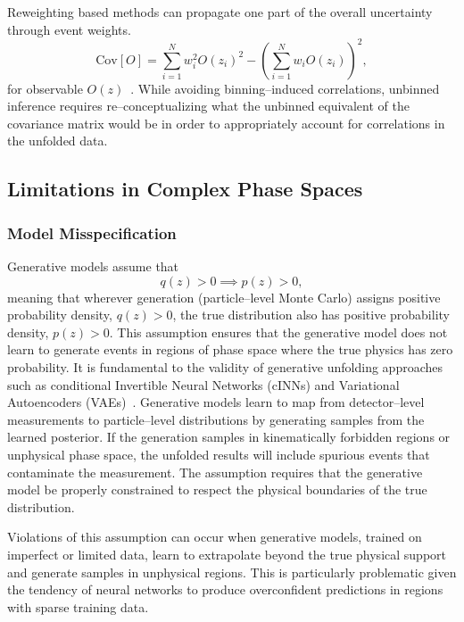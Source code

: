             Reweighting based methods can propagate one part of the overall uncertainty through event weights.
            \begin{equation}
                \text{Cov}[O] = \sum_{i=1}^N w_i^2 O(z_i)^2 - \left(\sum_{i=1}^N w_i O(z_i)\right)^2,
            \end{equation}
            for observable \(O(z)\)~\cite{LHCHiggsCrossSectionWorkingGroup2012HandbookDistributions}.
            While avoiding binning--induced correlations, unbinned inference requires re--conceptualizing what the unbinned equivalent of the covariance matrix would be in order to appropriately account for correlations in the unfolded data.
    \subsection{Limitations in Complex Phase Spaces}  
        \subsubsection{Model Misspecification}  
            Generative models assume that \[q(z) > 0 \implies p(z) > 0,\] meaning that wherever generation (particle--level Monte Carlo) assigns positive probability density, \(q(z) > 0\), the true distribution also has positive probability density, \(p(z) > 0\).
            This assumption ensures that the generative model does not learn to generate events in regions of phase space where the true physics has zero probability.
            It is fundamental to the validity of generative unfolding approaches such as conditional Invertible Neural Networks (cINNs) and Variational Autoencoders (VAEs)~\cite{Shmakov2025FullDiffusion}.
            Generative models learn to map from detector--level measurements to particle--level distributions by generating samples from the learned posterior.
            If the generation samples in kinematically forbidden regions or unphysical phase space, the unfolded results will include spurious events that contaminate the measurement.
            The assumption requires that the generative model be properly constrained to respect the physical boundaries of the true distribution.
            
            Violations of this assumption can occur when generative models, trained on imperfect or limited data, learn to extrapolate beyond the true physical support and generate samples in unphysical regions.
            This is particularly problematic given the tendency of neural networks to produce overconfident predictions in regions with sparse training data.
            
